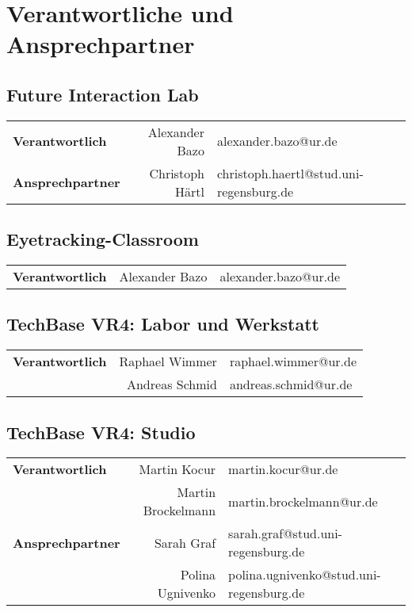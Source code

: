 \clearpage

\appendix

\section{Verantwortliche und Ansprechpartner}\label{app:verantwortliche}

\subsection*{Future Interaction Lab}

\begin{tabularx}{1.1\textwidth}{lrX}
    \textbf{Verantwortlich} & Alexander Bazo & alexander.bazo@ur.de \\
    \textbf{Ansprechpartner} & Christoph Härtl & christoph.haertl@stud.uni-regensburg.de \\
\end{tabularx}

\subsection*{Eyetracking-Classroom}

\begin{tabularx}{\textwidth}{lrX}
    \textbf{Verantwortlich} & Alexander Bazo & alexander.bazo@ur.de \\
\end{tabularx}

\subsection*{TechBase VR4: Labor und Werkstatt}

\begin{tabularx}{\textwidth}{lrX}
    \textbf{Verantwortlich} & Raphael Wimmer & raphael.wimmer@ur.de \\
    & Andreas Schmid & andreas.schmid@ur.de \\
\end{tabularx}

\subsection*{TechBase VR4: Studio}

\begin{tabularx}{1.1\textwidth}{lrX}
    \textbf{Verantwortlich} & Martin Kocur & martin.kocur@ur.de \\
    & Martin Brockelmann & martin.brockelmann@ur.de \\
    \textbf{Ansprechpartner} & Sarah Graf & sarah.graf@stud.uni-regensburg.de \\
    & Polina Ugnivenko & polina.ugnivenko@stud.uni-regensburg.de \\
\end{tabularx}


